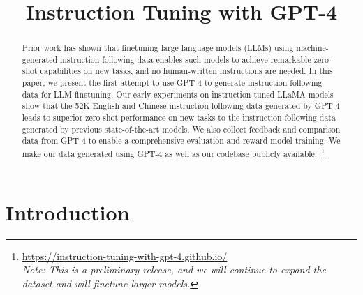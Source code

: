 \title{Instruction Tuning with GPT-4}

\begin{abstract}
Prior work has shown that finetuning large language models (LLMs) using machine-generated instruction-following data enables such models to achieve remarkable zero-shot capabilities on new tasks, and no human-written instructions are needed. In this paper, we present the first attempt to use GPT-4 to generate instruction-following data for LLM finetuning. Our early experiments on instruction-tuned LLaMA models show that the 52K English and Chinese instruction-following data generated by GPT-4 leads to superior zero-shot performance on new tasks to the instruction-following data generated by previous state-of-the-art models. We also collect feedback and comparison data from GPT-4 to enable a comprehensive evaluation and reward model training. We make our data generated using GPT-4 as well as our codebase publicly available.~\footnote{\url{https://instruction-tuning-with-gpt-4.github.io/}\\\textit{Note: This is a preliminary release, and we will continue to expand the dataset and will finetune larger models.}}

\end{abstract}

\section{Introduction}

